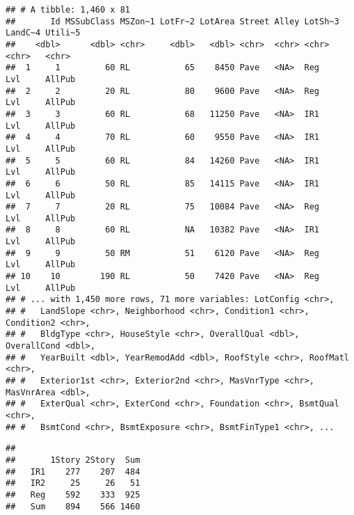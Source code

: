 \documentclass[
]{article}
\newenvironment{Shaded}{\begin{snugshade}}{\end{snugshade}}
\newcommand{\FunctionTok}[1]{\textcolor[rgb]{0.00,0.00,0.00}{#1}}
\newcommand{\NormalTok}[1]{#1}
\newcommand{\OtherTok}[1]{\textcolor[rgb]{0.56,0.35,0.01}{#1}}
\newcommand{\SpecialCharTok}[1]{\textcolor[rgb]{0.00,0.00,0.00}{#1}}
\begin{document}
\begin{verbatim}
## # A tibble: 1,460 x 81
##       Id MSSubClass MSZon~1 LotFr~2 LotArea Street Alley LotSh~3 LandC~4 Utili~5
##    <dbl>      <dbl> <chr>     <dbl>   <dbl> <chr>  <chr> <chr>   <chr>   <chr>  
##  1     1         60 RL           65    8450 Pave   <NA>  Reg     Lvl     AllPub 
##  2     2         20 RL           80    9600 Pave   <NA>  Reg     Lvl     AllPub 
##  3     3         60 RL           68   11250 Pave   <NA>  IR1     Lvl     AllPub 
##  4     4         70 RL           60    9550 Pave   <NA>  IR1     Lvl     AllPub 
##  5     5         60 RL           84   14260 Pave   <NA>  IR1     Lvl     AllPub 
##  6     6         50 RL           85   14115 Pave   <NA>  IR1     Lvl     AllPub 
##  7     7         20 RL           75   10084 Pave   <NA>  Reg     Lvl     AllPub 
##  8     8         60 RL           NA   10382 Pave   <NA>  IR1     Lvl     AllPub 
##  9     9         50 RM           51    6120 Pave   <NA>  Reg     Lvl     AllPub 
## 10    10        190 RL           50    7420 Pave   <NA>  Reg     Lvl     AllPub 
## # ... with 1,450 more rows, 71 more variables: LotConfig <chr>,
## #   LandSlope <chr>, Neighborhood <chr>, Condition1 <chr>, Condition2 <chr>,
## #   BldgType <chr>, HouseStyle <chr>, OverallQual <dbl>, OverallCond <dbl>,
## #   YearBuilt <dbl>, YearRemodAdd <dbl>, RoofStyle <chr>, RoofMatl <chr>,
## #   Exterior1st <chr>, Exterior2nd <chr>, MasVnrType <chr>, MasVnrArea <dbl>,
## #   ExterQual <chr>, ExterCond <chr>, Foundation <chr>, BsmtQual <chr>,
## #   BsmtCond <chr>, BsmtExposure <chr>, BsmtFinType1 <chr>, ...
\end{verbatim}

\begin{Shaded}
\end{Shaded}

\begin{verbatim}
##      
##       1Story 2Story  Sum
##   IR1    277    207  484
##   IR2     25     26   51
##   Reg    592    333  925
##   Sum    894    566 1460
\end{verbatim}
\end{document}
